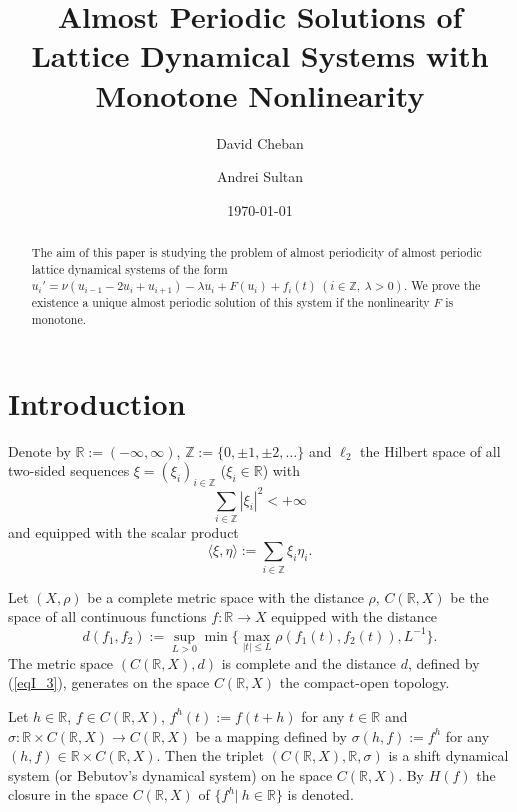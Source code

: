 \documentclass{amsart}%
\title[Almost Periodic Solutions of Lattice Dynamical Systems \dots ]{Almost Periodic Solutions of Lattice Dynamical Systems with Monotone Nonlinearity}
\author{David Cheban}
\author{Andrei Sultan}
\date{\today}
\begin{document}
\begin{abstract}
The aim of this paper is studying the problem of almost
periodicity of almost periodic lattice dynamical systems of the
form $u_{i}'=\nu (u_{i-1}-2u_i+u_{i+1})-\lambda
u_{i}+F(u_i)+f_{i}(t)\ (i\in \mathbb Z,\ \lambda >0)$. We prove
the existence a unique almost periodic solution of this system if
the nonlinearity $F$ is monotone.
\end{abstract}

\maketitle



\section{Introduction}\label{Sec1}

Denote by $\mathbb R :=(-\infty,\infty)$, $\mathbb Z :=\{0,\pm
1,\pm 2,\ldots\}$ and $\ell_{2}$ the Hilbert space of all
two-sided sequences $\xi =(\xi_{i})_{i\in \mathbb Z}$ ($\xi_{i}\in
\mathbb R$) with
\begin{equation}\label{eqI_1}
\sum\limits_{i\in \mathbb Z}|\xi_{i}|^{2}<+\infty \nonumber
\end{equation}
and equipped with the scalar product
\begin{equation}\label{eqI_2}
\langle \xi,\eta\rangle :=\sum\limits_{i\in \mathbb
Z}\xi_{i}\eta_{i} .\nonumber
\end{equation}

Let $(X,\rho)$ be a complete metric space with the distance
$\rho$, $C(\mathbb R,X)$ be the space of all continuous functions
$f:\mathbb R\to X$ equipped with the distance
\begin{equation}\label{eqI_3}
d(f_1,f_2):=\sup\limits_{L>0}\min\{\max\limits_{|t|\le
L}\rho(f_{1}(t),f_{2}(t)),L^{-1}\}.
\end{equation}
The metric space $(C(\mathbb R,X),d)$ is complete and the distance
$d$, defined by (\ref{eqI_3}), generates on the space $C(\mathbb
R,X)$ the compact-open topology.

Let $h\in \mathbb R$, $f\in C(\mathbb R,X)$, $f^{h}(t):=f(t+h)$
for any $t\in \mathbb R$ and $\sigma :\mathbb R\times C(\mathbb
R,X)\to C(\mathbb R,X)$ be a mapping defined by
$\sigma(h,f):=f^{h}$ for any $(h,f)\in \mathbb R\times C(\mathbb
R,X)$. Then \cite[Ch.I]{Che_2015} the triplet $(C(\mathbb
R,X),\mathbb R,\sigma)$ is a shift dynamical system (or Bebutov's
dynamical system) on he space $C(\mathbb R,X)$. By $H(f)$ the
closure in the space $C(\mathbb R,X)$ of $\{f^{h}|\ h\in \mathbb
R\}$ is denoted.
\end{document}
